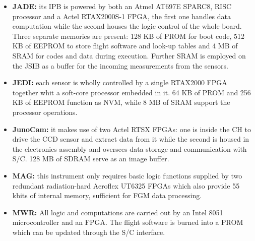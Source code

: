 \begin{itemize}
    \item \textbf{JADE:} its IPB is powered by both an Atmel AT697E SPARC8, RISC processor and a Actel RTAX2000S-1 FPGA, the first one handles data computation while the second houses the logic control of the whole board. Three separate memories are present: 128 KB of PROM for boot code, 512 KB of EEPROM to store flight software and look-up tables and 4 MB of SRAM for codes and data during execution. Further SRAM is employed on the JSIB as a buffer for the incoming measurements from the sensors. \cite{JADE_info}
    \item \textbf{JEDI:} each sensor is wholly controlled by a single RTAX2000 FPGA together whit a soft-core processor embedded in it. 64 KB of PROM and 256 KB of EEPROM function as NVM, while 8 MB of SRAM support the processor operations. \cite{JEDI_info}
    \item \textbf{JunoCam:} it makes use of two Actel RTSX FPGAs: one is inside the CH to drive the CCD sensor and extract data from it while the second is housed in the electronics assembly and oversees data storage and communication with S/C. 128 MB of SDRAM serve as an image buffer.
    \item \textbf{MAG:} this instrument only requires basic logic functions supplied by two redundant radiation-hard Aeroflex UT6325 FPGAs which also provide 55 kbits of internal memory, sufficient for FGM data processing.
    \item \textbf{MWR:} All logic and computations are carried out by an Intel 8051 microcontroller and an FPGA. The flight software is burned into a PROM which can be updated through the S/C interface.        
\end{itemize} 